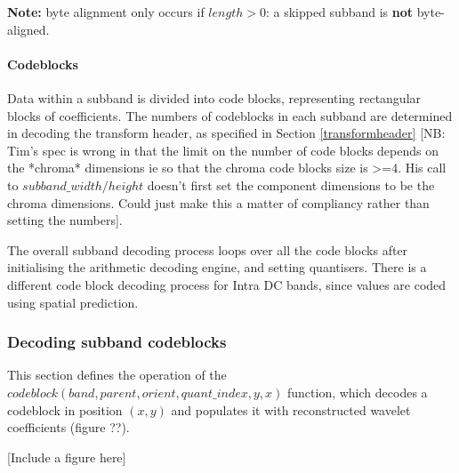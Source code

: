{\bf Note:} byte alignment only occurs if $length>0$: a skipped 
subband is {\bf not} byte-aligned.

\paragraph{Codeblocks\newline}

Data within a subband is divided into code blocks,
representing rectangular blocks of coefficients. The numbers of codeblocks
in each subband are determined in decoding the transform header, as specified
in Section \ref{transformheader} [NB: Tim's spec is wrong in that the limit on
the number of code blocks depends on the *chroma* dimensions ie so that the
chroma code blocks size is >=4. His call to $subband\_width/height$ doesn't first 
set the component dimensions to be the chroma dimensions. Could just make this a 
matter of compliancy rather than setting the numbers].

The overall subband decoding process loops over all the code blocks after initialising the
arithmetic decoding engine, and setting quantisers. There is a different code block decoding
process for Intra DC bands, since values are coded using spatial prediction.

\begin{pseudo*}
\bsCODE{\hdots}
\bsELSE
\bsEND
{}
    \bsEND
\bsEND

\bsEND
\end{pseudo*}


\subsubsection{Decoding subband codeblocks}

\label{codeblocks}

This section defines the operation of the 
$codeblock(band,parent,orient,quant\_index,y,x)$ function, which decodes a 
codeblock in position $(x,y)$ and populates it with reconstructed 
wavelet coefficients (figure ??).

[Include a figure here]

